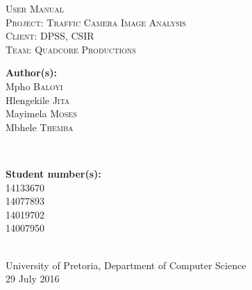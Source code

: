 \documentclass[a4paper,12pt]{article}
\begin{document}
\begin{titlepage}
\center

\textsc{\LARGE User Manual}\\[1.5cm]
\textsc{\Large Project: Traffic Camera Image Analysis}\\[1.5cm]
\textsc{\large Client: DPSS, CSIR}\\[0.5cm]
\textsc{\large Team: Quadcore Productions}\\[0.5cm]

\begin{minipage}{0.4\textwidth}
\begin{flushleft} \large
\textbf{Author(s):}\\
Mpho \textsc{Baloyi}\\
Hlengekile \textsc{Jita}\\
Mayimela \textsc{Moses}\\
Mbhele \textsc{Themba}\\
\end{flushleft}
\end{minipage}
~
\begin{minipage}{0.4\textwidth}
\begin{flushright} \large
\textbf{Student number(s):} \\
14133670\\ %
14077893\\
14019702\\
14007950\\
\end{flushright}
\end{minipage}\\

{\large University of Pretoria, Department of Computer Science}\\

{\large 29 July 2016}\\[3cm]

\vfil

\end{titlepage}

\newpage
\tableofcontents
\newpage

\newpage
\begin{comment}
\begin{table}[]
 \centering
 \caption{Version History}
 \label{tab:table1}
 \begin{tabular}{ccc}
   \toprule
    Version No. & Date & Changes & By\\
    \midrule
    1 & 29 July 2016 & Application Installation & Mpho Baloyi, Hlengekile Jita, Moses Mayimela, Themba Mbhele \\
    \bottomrule
  \end{tabular}
\end{table}
\end{comment}
\newpage
\end{document}
